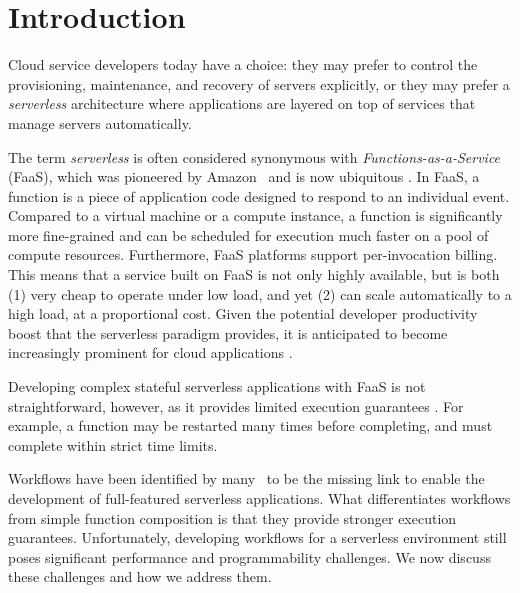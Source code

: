\section{Introduction}

Cloud service developers today have a choice: they may prefer to control the provisioning, maintenance, and recovery of servers explicitly, or they may prefer a \emph{serverless} architecture where applications are layered on top of services that manage servers automatically. 

The term \emph{serverless} is often considered synonymous with \textit{Functions-as-a-Service} (FaaS), which was pioneered by Amazon~\cite{aws-lambda} and is now ubiquitous \cite{google-cloud-functions,azure-functions,openwhisk,fission}. In FaaS, a function is a piece of application code designed to respond to an individual event. Compared to a virtual machine or a compute instance, a function is significantly more fine-grained and can be scheduled for execution much faster on a pool of compute resources. Furthermore, FaaS platforms support per-invocation billing. This means that a service built on FaaS is not only highly available, but is both (1) very cheap to operate under low load, and yet (2) can scale automatically to a high load, at a proportional cost. Given the potential developer productivity boost that the serverless paradigm provides, it is anticipated to become increasingly prominent for cloud applications \cite{DBLP:journals/corr/abs-1902-03383,revolution}. 

Developing complex stateful serverless applications with FaaS is not straightforward, however, as it provides limited execution guarantees \cite{jangda-et-al}. For example, a function may be restarted many times before completing, and must complete within strict time limits. 

Workflows have been identified by many~\cite{sreekanti2020cloudburst,eismann2020predicting,azure-durable-functions,step-functions,scientific-workflows} to be the missing link to enable the development of full-featured serverless applications.
What differentiates workflows from simple function composition is that they provide stronger execution guarantees. Unfortunately, developing workflows for a serverless environment still poses significant performance and programmability challenges. We now discuss these challenges and how we address them.

